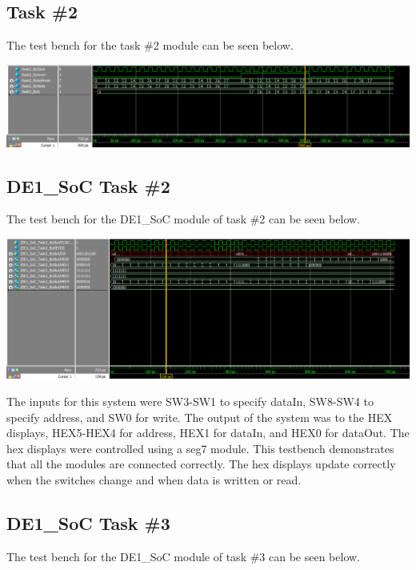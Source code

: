 \documentclass[11pt, titlepage]{article}
\begin{document}
        \subsection{Task \#2}
            The test bench for the task \#2 module can be seen below. \\

            \begin{center}
                \includegraphics[scale = 0.5]{Images/task 2 testbench.png}
            \end{center}

        \newpage

        \subsection{DE1\_SoC Task \#2}
            The test bench for the DE1\_SoC module of task \#2 can be seen below. \\

            \begin{center}
                \includegraphics[scale = 0.5]{Images/task 2 DE1 testbench.png}
            \end{center}

            The inputs for this system were SW3-SW1 to specify dataIn, SW8-SW4 to specify address, and SW0 for write. The output of the system was to the HEX displays, HEX5-HEX4 for address, HEX1 for dataIn, and HEX0 for dataOut. The hex displays were controlled using a seg7 module. This testbench demonstrates that all the modules are connected correctly. The hex displays update correctly when the switches change and when data is written or read.
        
        \subsection{DE1\_SoC Task \#3}
            The test bench for the DE1\_SoC module of task \#3 can be seen below.
\end{document}
